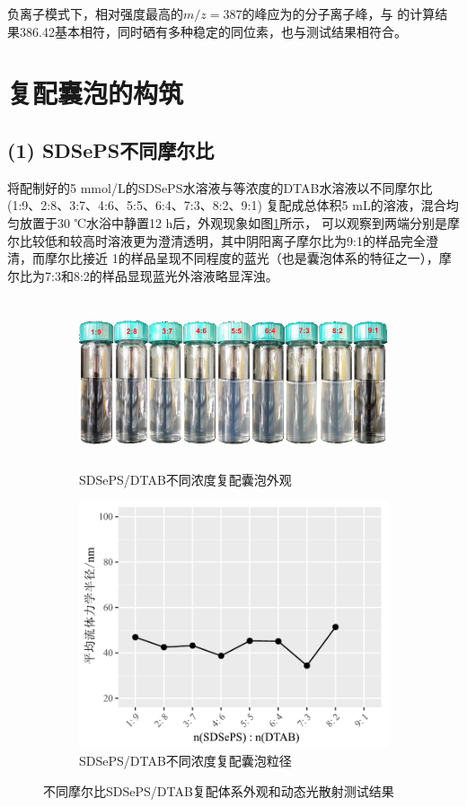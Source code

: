 \documentclass[bachelor,fandolfonts,replaceperiod]{jnuthesis}
\begin{document}
    负离子模式下，相对强度最高的$m/z = 387$的峰应为的分子离子峰，与
    的计算结果386.42基本相符，同时硒有多种稳定的同位素，也与测试结果相符合。

    \section{复配囊泡的构筑}
    \subsection*{(1) SDSePS不同摩尔比}
    将配制好的5 mmol/L的SDSePS水溶液与等浓度的DTAB水溶液以不同摩尔比 (1:9、2:8、3:7、4:6、5:5、6:4、7:3、8:2、9:1)
    复配成总体积5 mL的溶液，混合均匀放置于30 ℃水浴中静置12 h后，外观现象如图\ref{fig:SDSePS-DTAB-ratio}所示，
    可以观察到两端分别是摩尔比较低和较高时溶液更为澄清透明，其中阴阳离子摩尔比为9:1的样品完全澄清，而摩尔比接近
    1的样品呈现不同程度的蓝光（也是囊泡体系的特征之一），摩尔比为7:3和8:2的样品显现蓝光外溶液略显浑浊。
    \begin{figure}[htbp]
        \centering
        \begin{subfigure}[]{\textwidth}
            \centering
            \includegraphics[height=5cm]{figure/SDSePS-DTAB-ratio.png}
            \caption{SDSePS/DTAB不同浓度复配囊泡外观}\label{fig:SDSePS-DTAB-ratio}
        \end{subfigure}%
        
        \begin{subfigure}[]{\textwidth}
            \centering
            \includegraphics[width=.6\textwidth]{figure/SDSePS-DTAB-ratio-fig.pdf}
            \caption{SDSePS/DTAB不同浓度复配囊泡粒径}\label{fig:SDSePS-DTAB-ratio-fig}
        \end{subfigure}%
        \caption{不同摩尔比SDSePS/DTAB复配体系外观和动态光散射测试结果}
        \label{fig:不同摩尔比SDSePS/DTAB}
    \end{figure}
\end{document}
